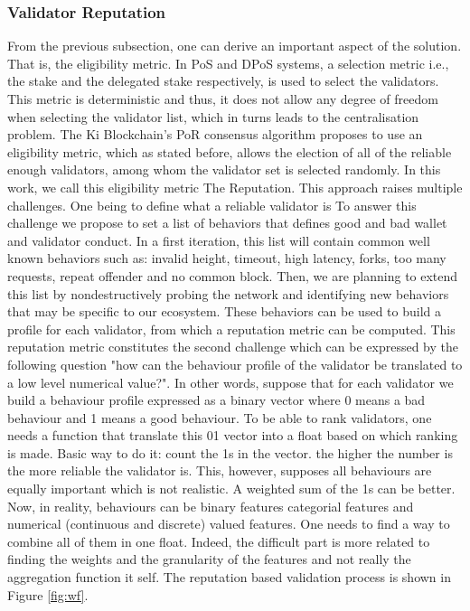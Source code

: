 \subsubsection{Validator Reputation} From the previous subsection, one can derive an important aspect of the solution. That is, the eligibility metric. In PoS and DPoS systems, a selection metric i.e., the stake and the delegated stake respectively, is used to select the validators. This metric is deterministic and thus, it does not allow any degree of freedom when selecting the validator list, which in turns leads to the centralisation problem. The Ki Blockchain’s PoR consensus algorithm proposes to use an eligibility metric, which as stated before, allows the election of all of the reliable enough validators, among whom the validator set is selected randomly. In this work, we call this eligibility metric The Reputation. This approach raises multiple challenges. One being to define what a reliable validator is To answer this challenge we propose to set a list of behaviors that defines good and bad wallet and validator conduct. In a first iteration,    this list will contain common well known behaviors such as: invalid height, timeout, high latency, forks, too many requests, repeat offender and no common block. Then, we are planning to extend this list by nondestructively probing the network and identifying new behaviors that may be specific to our ecosystem. These behaviors can be used to build a profile for each validator, from which a reputation metric can be computed. 
This reputation metric constitutes the second challenge which can be expressed by the following question "how can the behaviour profile of the validator be translated to a low level numerical value?". In other words, suppose that for each validator we build a behaviour profile expressed as a binary vector where 0 means a bad behaviour and 1 means a good behaviour. To be able to rank validators, one needs a function that translate this 01 vector into a float based on which ranking is made. Basic way to do it: count the 1s in the vector. the higher the number is the more reliable the validator is. This, however, supposes all behaviours are equally important which is not realistic. A weighted sum of the 1s can be better. Now, in reality, behaviours can be binary features categorial features and numerical (continuous and discrete) valued features. One needs to find a way to combine all of them in one float. Indeed, the difficult part is more related to finding the weights and the granularity of the features and not really the aggregation function it self. The reputation based validation process is shown in Figure \ref{fig:wf}. 

